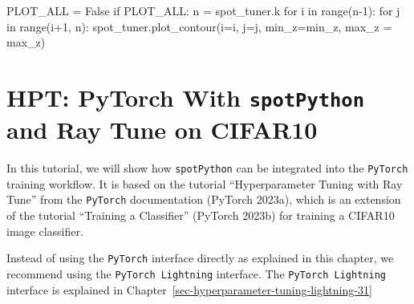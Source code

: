 \documentclass[
  letterpaper,
  DIV=11,
  numbers=noendperiod]{scrreprt}
\newenvironment{Shaded}{\begin{snugshade}}{\end{snugshade}}
\newcommand{\BuiltInTok}[1]{\textcolor[rgb]{0.00,0.23,0.31}{#1}}
\newcommand{\ControlFlowTok}[1]{\textcolor[rgb]{0.00,0.23,0.31}{#1}}
\newcommand{\DecValTok}[1]{\textcolor[rgb]{0.68,0.00,0.00}{#1}}
\newcommand{\KeywordTok}[1]{\textcolor[rgb]{0.00,0.23,0.31}{#1}}
\newcommand{\NormalTok}[1]{\textcolor[rgb]{0.00,0.23,0.31}{#1}}
\newcommand{\OperatorTok}[1]{\textcolor[rgb]{0.37,0.37,0.37}{#1}}
\newcommand{\VariableTok}[1]{\textcolor[rgb]{0.07,0.07,0.07}{#1}}
\begin{document}
\begin{Shaded}
\begin{Highlighting}[]
\NormalTok{PLOT\_ALL }\OperatorTok{=} \VariableTok{False}
\ControlFlowTok{if}\NormalTok{ PLOT\_ALL:}
\NormalTok{    n }\OperatorTok{=}\NormalTok{ spot\_tuner.k}
    \ControlFlowTok{for}\NormalTok{ i }\KeywordTok{in} \BuiltInTok{range}\NormalTok{(n}\OperatorTok{{-}}\DecValTok{1}\NormalTok{):}
        \ControlFlowTok{for}\NormalTok{ j }\KeywordTok{in} \BuiltInTok{range}\NormalTok{(i}\OperatorTok{+}\DecValTok{1}\NormalTok{, n):}
\NormalTok{            spot\_tuner.plot\_contour(i}\OperatorTok{=}\NormalTok{i, j}\OperatorTok{=}\NormalTok{j, min\_z}\OperatorTok{=}\NormalTok{min\_z, max\_z }\OperatorTok{=}\NormalTok{ max\_z)}
\end{Highlighting}
\end{Shaded}

\hypertarget{sec-hyperparameter-tuning-for-pytorch-14}{%
\chapter{\texorpdfstring{HPT: PyTorch With \texttt{spotPython} and Ray
Tune on
CIFAR10}{HPT: PyTorch With spotPython and Ray Tune on CIFAR10}}\label{sec-hyperparameter-tuning-for-pytorch-14}}

In this tutorial, we will show how \texttt{spotPython} can be integrated
into the \texttt{PyTorch} training workflow. It is based on the tutorial
``Hyperparameter Tuning with Ray Tune'' from the \texttt{PyTorch}
documentation (PyTorch 2023a), which is an extension of the tutorial
``Training a Classifier'' (PyTorch 2023b) for training a CIFAR10 image
classifier.

\begin{tcolorbox}[enhanced jigsaw, left=2mm, title=\textcolor{quarto-callout-note-color}{\faInfo}\hspace{0.5em}{Note: PyTorch and Lightning}, bottomrule=.15mm, titlerule=0mm, breakable, rightrule=.15mm, toprule=.15mm, coltitle=black, colbacktitle=quarto-callout-note-color!10!white, leftrule=.75mm, arc=.35mm, colframe=quarto-callout-note-color-frame, bottomtitle=1mm, colback=white, opacitybacktitle=0.6, toptitle=1mm, opacityback=0]

Instead of using the \texttt{PyTorch} interface directly as explained in
this chapter, we recommend using the \texttt{PyTorch\ Lightning}
interface. The \texttt{PyTorch\ Lightning} interface is explained in
Chapter~\ref{sec-hyperparameter-tuning-lightning-31}

\end{tcolorbox}
\end{document}
